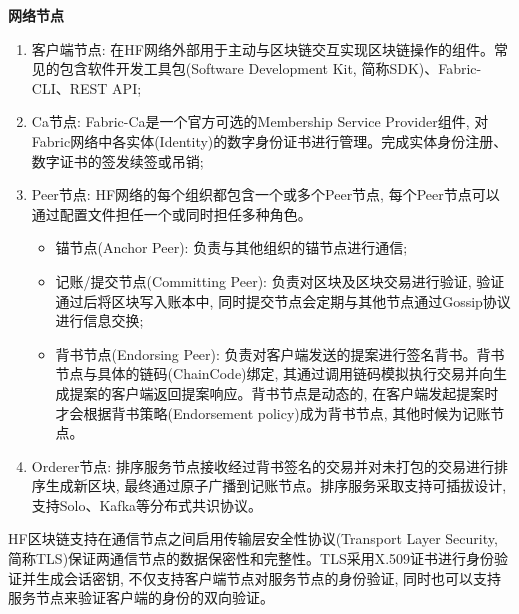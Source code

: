\textbf{网络节点}
\begin{enumerate}[fullwidth,itemindent=2em,label=(\arabic*)]
    \item 客户端节点: 在HF网络外部用于主动与区块链交互实现区块链操作的组件。常见的包含软件开发工具包(Software Development Kit, 简称SDK)\footnotemark[2]、Fabric-CLI\footnotemark[3]、REST API\footnotemark[4];

    \item Ca节点: Fabric-Ca\footnotemark[5]是一个官方可选的Membership Service Provider组件, 对Fabric网络中各实体(Identity)的数字身份证书进行管理。完成实体身份注册、数字证书的签发续签或吊销;

    \item Peer节点: HF网络的每个组织都包含一个或多个Peer节点, 每个Peer节点可以通过配置文件担任一个或同时担任多种角色。

    \begin{itemize}[itemindent=2em]
        \item 锚节点(Anchor Peer): 负责与其他组织的锚节点进行通信;

        \item 记账/提交节点(Committing Peer): 负责对区块及区块交易进行验证, 验证通过后将区块写入账本中, 同时提交节点会定期与其他节点通过Gossip协议进行信息交换;

        \item 背书节点(Endorsing Peer): 负责对客户端发送的提案进行签名背书。背书节点与具体的链码(ChainCode)绑定, 其通过调用链码模拟执行交易并向生成提案的客户端返回提案响应。背书节点是动态的, 在客户端发起提案时才会根据背书策略(Endorsement policy)成为背书节点, 其他时候为记账节点。
    \end{itemize}

    \item Orderer节点: 排序服务节点接收经过背书签名的交易并对未打包的交易进行排序生成新区块, 最终通过原子广播到记账节点。排序服务采取支持可插拔设计, 支持Solo、Kafka等分布式共识协议。

\end{enumerate}

HF区块链支持在通信节点之间启用传输层安全性协议(Transport Layer Security, 简称TLS)保证两通信节点的数据保密性和完整性。TLS采用X.509证书进行身份验证并生成会话密钥, 不仅支持客户端节点对服务节点的身份验证, 同时也可以支持服务节点来验证客户端的身份的双向验证。

